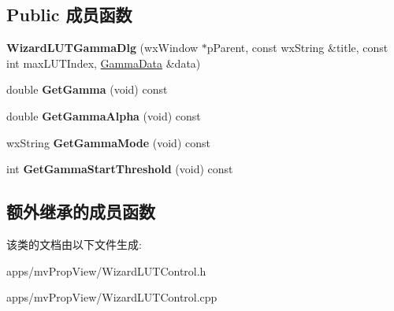 \subsection*{Public 成员函数}
\begin{DoxyCompactItemize}
\item 
\hypertarget{class_wizard_l_u_t_gamma_dlg_a5b30cd0ad59def746fb3f7204b201ba9}{{\bfseries Wizard\+L\+U\+T\+Gamma\+Dlg} (wx\+Window $\ast$p\+Parent, const wx\+String \&title, const int max\+L\+U\+T\+Index, \hyperlink{struct_gamma_data}{Gamma\+Data} \&data)}\label{class_wizard_l_u_t_gamma_dlg_a5b30cd0ad59def746fb3f7204b201ba9}

\item 
\hypertarget{class_wizard_l_u_t_gamma_dlg_a729046e17dcea3cfd8f8f30d7cc03815}{double {\bfseries Get\+Gamma} (void) const }\label{class_wizard_l_u_t_gamma_dlg_a729046e17dcea3cfd8f8f30d7cc03815}

\item 
\hypertarget{class_wizard_l_u_t_gamma_dlg_a470527373d502d6a4d646b22bbac1716}{double {\bfseries Get\+Gamma\+Alpha} (void) const }\label{class_wizard_l_u_t_gamma_dlg_a470527373d502d6a4d646b22bbac1716}

\item 
\hypertarget{class_wizard_l_u_t_gamma_dlg_aeb7421eaa16f71f1934cb403a34ef5af}{wx\+String {\bfseries Get\+Gamma\+Mode} (void) const }\label{class_wizard_l_u_t_gamma_dlg_aeb7421eaa16f71f1934cb403a34ef5af}

\item 
\hypertarget{class_wizard_l_u_t_gamma_dlg_a7310758e98b6d6858049c21e9b579435}{int {\bfseries Get\+Gamma\+Start\+Threshold} (void) const }\label{class_wizard_l_u_t_gamma_dlg_a7310758e98b6d6858049c21e9b579435}

\end{DoxyCompactItemize}
\subsection*{额外继承的成员函数}


该类的文档由以下文件生成\+:\begin{DoxyCompactItemize}
\item 
apps/mv\+Prop\+View/Wizard\+L\+U\+T\+Control.\+h\item 
apps/mv\+Prop\+View/Wizard\+L\+U\+T\+Control.\+cpp\end{DoxyCompactItemize}
